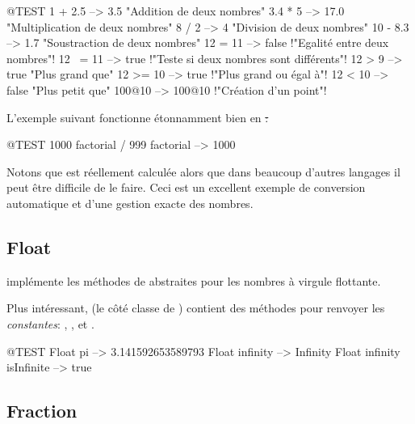 \documentclass[a4paper,10pt,twoside]{book}
\begin{document}
\begin{code}{@TEST}
1 + 2.5     --> 3.5             "Addition de deux nombres"
3.4 * 5      --> 17.0           "Multiplication de deux nombres"
8 / 2         --> 4                 "Division de deux nombres"
10 - 8.3   --> 1.7              "Soustraction de deux nombres"
12 = 11    --> false           !"Egalit\'e entre deux nombres"!
12 ~= 11 --> true            !"Teste si deux nombres sont diff\'erents"!
12 > 9      --> true            "Plus grand que"
12 >= 10  --> true            !"Plus grand ou \'egal \`a"!
12 < 10    --> false           "Plus petit que"
100@10   --> 100@10    !"Cr\'eation d'un point"!
\end{code}

L'exemple suivant fonctionne \'etonnamment bien en \st:
\begin{code}{@TEST}
1000 factorial / 999 factorial --> 1000
\end{code}
Notons que  est r\'eellement calcul\'ee alors que dans beaucoup d'autres langages il peut \^etre difficile de le faire. Ceci est un excellent exemple de conversion automatique et d'une gestion exacte des nombres.


\subsection{Float}

 impl\'emente les m\'ethodes de  abstraites pour les nombres \`a virgule flottante.

Plus int\'eressant,  (\ie le c\^ot\'e classe de ) contient des m\'ethodes pour renvoyer les \emph{constantes}: , ,  et .

\begin{code}{@TEST}
Float pi                      --> 3.141592653589793
Float infinity               --> Infinity
Float infinity isInfinite --> true
\end{code}

\subsection{Fraction}
\end{document}
